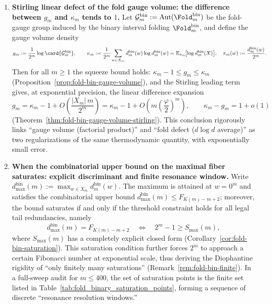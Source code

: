 \begin{enumerate}
  \item \textbf{Stirling linear defect of the fold gauge volume: the difference between \texorpdfstring{$g_m$}{gm} and \texorpdfstring{$\kappa_m$}{kappa} tends to \(1\).}
  Let
  \(\mathcal{G}^{\mathrm{bin}}_m:=\mathrm{Aut}(\Fold^{\mathrm{bin}}_m)\)
  be the fold-gauge group induced by the binary interval folding \(\Fold^{\mathrm{bin}}_m\), and define the gauge volume density
  \[
  g_m:=\frac{1}{2^m}\log\card{\mathcal{G}^{\mathrm{bin}}_m},
  \qquad
  \kappa_m
  :=\frac{1}{2^m}\sum_{w\in X_m}d^{\mathrm{bin}}_m(w)\log d^{\mathrm{bin}}_m(w)
  =\mathbb{E}_{\pi_m}\!\bigl[\log d^{\mathrm{bin}}_m(X)\bigr],
  \quad
  \pi_m(w):=\frac{d^{\mathrm{bin}}_m(w)}{2^m}.
  \]
  Then for all \(m\ge 1\) the squeeze bound holds:
  \(
  \kappa_m-1\le g_m\le \kappa_m
  \)
  (Proposition~\ref{prop:fold-bin-gauge-volume}), and the Stirling leading term gives, at exponential precision, the linear difference expansion
  \[
  g_m=\kappa_m-1+O\!\left(\frac{|X_m|\,m}{2^m}\right)
  =\kappa_m-1+O\!\left(m\left(\frac{\varphi}{2}\right)^m\right),
  \qquad
  \kappa_m-g_m=1+o(1)
  \]
  (Theorem~\ref{thm:fold-bin-gauge-volume-stirling}).
  This conclusion rigorously links ``gauge volume (factorial product)'' and ``fold defect (\(d\log d\) average)'' as two regularizations of the same thermodynamic quantity, with exponentially small error.

  \item \textbf{When the combinatorial upper bound on the maximal fiber saturates: explicit discriminant and finite resonance window.}
  Write
  \(d^{\mathrm{bin}}_{\max}(m):=\max_{w\in X_m}d^{\mathrm{bin}}_m(w)\).
  The maximum is attained at \(w=0^m\) and satisfies the combinatorial upper bound
  \(d^{\mathrm{bin}}_{\max}(m)\le F_{K(m)-m+2}\);
  moreover, the bound saturates if and only if the threshold constraint holds for all legal tail redundancies, namely
  \[
  d^{\mathrm{bin}}_{\max}(m)=F_{K(m)-m+2}
  \quad\Longleftrightarrow\quad
  2^m-1\ge S_{\max}(m),
  \]
  where \(S_{\max}(m)\) has a completely explicit closed form (Corollary~\ref{cor:fold-bin-saturation}).
  This saturation condition further forces \(2^m\) to approach a certain Fibonacci number at exponential scale, thus deriving the Diophantine rigidity of ``only finitely many saturations'' (Remark~\ref{rem:fold-bin-finite}).
  In a full-sweep audit for \(m\le 400\), the set of saturation points is the finite set listed in Table~\ref{tab:fold_binary_saturation_points}, forming a sequence of discrete ``resonance resolution windows.''


\end{enumerate}
